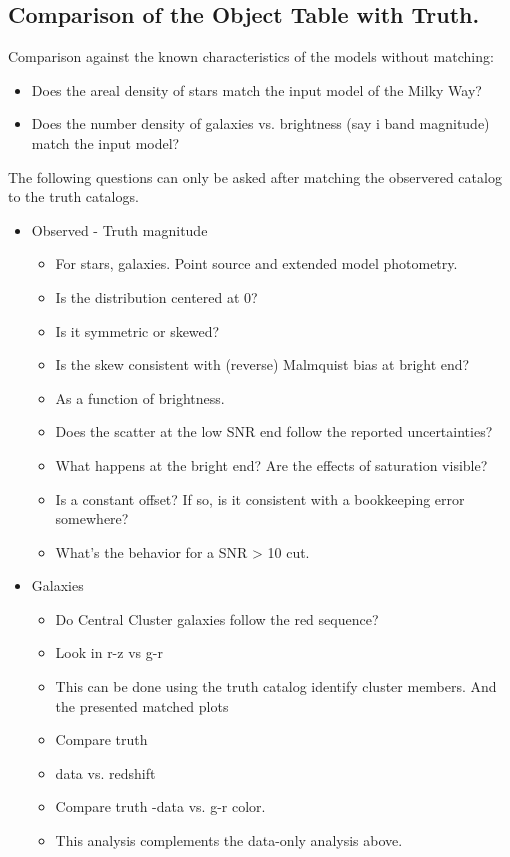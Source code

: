 \documentclass[11pt]{report}
\begin{document}
\subsection{Comparison of the Object Table with Truth.}

Comparison against the known characteristics of the models without matching:

\begin{itemize}
  \item Does the areal density of stars match the input model of the Milky Way?
  \item Does the number density of galaxies vs. brightness (say i band magnitude) match the input model?
\end{itemize}

The following questions can only be asked after matching the observered catalog to the truth catalogs.

\begin{itemize}
  \item Observed - Truth magnitude
  \begin{itemize}
      \item For stars, galaxies.  Point source and extended model photometry.
      \item Is the distribution centered at 0?
      \item Is it symmetric or skewed?
      \item Is the skew consistent with (reverse) Malmquist bias at bright end?
      \item As a function of brightness.
        \item Does the scatter at the low SNR end follow the reported uncertainties?
        \item What happens at the bright end? Are the effects of saturation visible?
      \item Is a constant offset?  If so, is it consistent with a bookkeeping error somewhere?
      \item What's the behavior for a SNR > 10 cut.
  \end{itemize}

  \item Galaxies
  \begin{itemize}
      \item Do Central Cluster galaxies follow the red sequence?
        \item Look in r-z vs g-r
        \item This can be done using the truth catalog identify cluster members.  And the presented matched plots
        \item Compare truth \item data vs. redshift
        \item Compare truth -data vs. g-r color.
        \item This analysis complements the data-only analysis above.
    \end{itemize}
\end{itemize}
\end{document}
